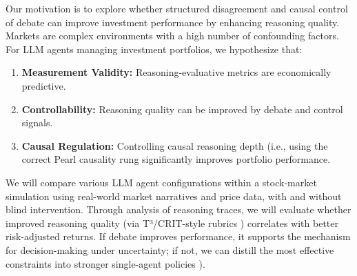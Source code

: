 \documentclass{article}
\begin{document}

Our motivation is to explore whether structured disagreement and causal control of debate can improve investment performance by enhancing reasoning quality. Markets are complex environments with a high number of confounding factors. For LLM agents managing investment portfolios, we hypothesize that: 
\begin{enumerate}[label=H\arabic*.]
    \item  \label{H1} \textbf{Measurement Validity:} Reasoning-evaluative metrics are economically predictive. 
    \item  \label{H2} \textbf{Controllability:} Reasoning quality can be improved by debate and  control signals.
    \item  \label{H3} \textbf{Causal Regulation:} Controlling causal reasoning depth (i.e., using the correct  Pearl causality rung \citep{pearl2009causality} significantly improves portfolio performance.


\end{enumerate}


We will compare various LLM agent configurations within a stock-market simulation using real-world market narratives and price data, with and without blind intervention. Through analysis of reasoning traces, we will evaluate whether improved reasoning quality (via T³/CRIT-style rubrics \citep{chang2023crit, raudit}) correlates with better risk-adjusted returns. If debate improves performance, it supports the mechanism for decision-making under uncertainty; if not, we can distill the most effective constraints into stronger single-agent policies \citep{quantagents2025, tradingagents2024}).
\end{document}
